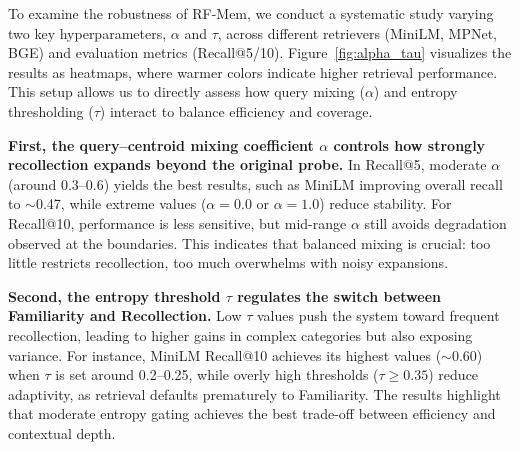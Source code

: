 To examine the robustness of RF-Mem, we conduct a systematic study varying two key hyperparameters, $\alpha$ and $\tau$, across different retrievers (MiniLM, MPNet, BGE) and evaluation metrics (Recall@5/10). Figure~\ref{fig:alpha_tau} visualizes the results as heatmaps, where warmer colors indicate higher retrieval performance. This setup allows us to directly assess how query mixing ($\alpha$) and entropy thresholding ($\tau$) interact to balance efficiency and coverage.

\textbf{First, the query–centroid mixing coefficient $\alpha$ controls how strongly recollection expands beyond the original probe.} In Recall@5, moderate $\alpha$ (around $0.3$–$0.6$) yields the best results, such as MiniLM improving overall recall to $\sim$0.47, while extreme values ($\alpha=0.0$ or $\alpha=1.0$) reduce stability. For Recall@10, performance is less sensitive, but mid-range $\alpha$ still avoids degradation observed at the boundaries. This indicates that balanced mixing is crucial: too little restricts recollection, too much overwhelms with noisy expansions.


\textbf{Second, the entropy threshold $\tau$ regulates the switch between Familiarity and Recollection.} Low $\tau$ values push the system toward frequent recollection, leading to higher gains in complex categories but also exposing variance. For instance, MiniLM Recall@10 achieves its highest values ($\sim$0.60) when $\tau$ is set around 0.2–0.25, while overly high thresholds ($\tau \geq 0.35$) reduce adaptivity, as retrieval defaults prematurely to Familiarity. The results highlight that moderate entropy gating achieves the best trade-off between efficiency and contextual depth.



